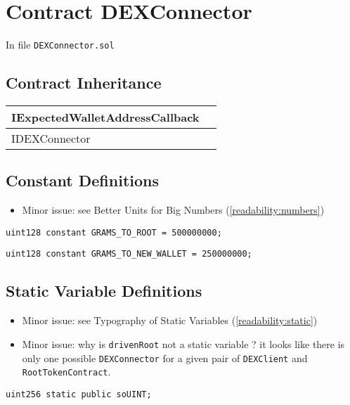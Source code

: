
\chapter{Contract DEXConnector}


In file {\tt DEXConnector.sol}

\section{Contract Inheritance}


\noindent\begin{tabular}{|l|p{5cm}|}\hline
IExpectedWalletAddressCallback & \\\hline
IDEXConnector & \\\hline
\end{tabular}


\section{Constant Definitions}

\begin{itemize}
\item Minor issue: see Better Units for Big Numbers (\ref{readability:numbers})
\end{itemize}

\begin{lstlisting}[firstnumber=19]
  uint128 constant GRAMS_TO_ROOT = 500000000;
\end{lstlisting}

\begin{lstlisting}[firstnumber=20]
  uint128 constant GRAMS_TO_NEW_WALLET = 250000000;
\end{lstlisting}

\section{Static Variable Definitions}


\begin{itemize}
\item Minor issue: see Typography of Static Variables (\ref{readability:static})
\item Minor issue: why is {\tt drivenRoot} not a static variable ? it
  looks like there is only one possible {\tt DEXConnector} for a given
  pair of {\tt DEXClient} and {\tt RootTokenContract}.
\end{itemize}

\begin{lstlisting}[firstnumber=15]
  uint256 static public soUINT;
\end{lstlisting}

